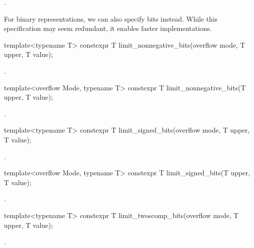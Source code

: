 \begin{addedblock}
\begin{itemdescr}
\returns {}.
\end{itemdescr}

For binary representations, we can also specify bits instead. While this specification may seem redundant, it enables faster implementations.

\begin{itemdecl}
template<typename T>
constexpr T limit_nonnegative_bits(overflow mode, T upper, T value);
\end{itemdecl}

\begin{itemdescr}
\returns {}.
\end{itemdescr}

\begin{itemdecl}
template<overflow Mode, typename T>
constexpr T limit_nonnegative_bits(T upper, T value);
\end{itemdecl}

\begin{itemdescr}
\returns {}.
\end{itemdescr}

\begin{itemdecl}
template<typename T>
constexpr T limit_signed_bits(overflow mode, T upper, T value);
\end{itemdecl}

\begin{itemdescr}
\returns {}.
\end{itemdescr}

\begin{itemdecl}
template<overflow Mode, typename T>
constexpr T limit_signed_bits(T upper, T value);
\end{itemdecl}

\begin{itemdescr}
\returns {}.
\end{itemdescr}

\begin{itemdecl}
template<typename T>
constexpr T limit_twoscomp_bits(overflow mode, T upper, T value);
\end{itemdecl}

\begin{itemdescr}
\returns {}.
\end{itemdescr}


\end{addedblock}
